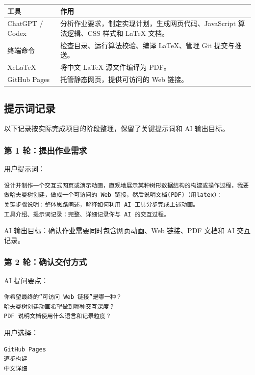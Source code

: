 \documentclass[UTF8,a4paper,12pt]{ctexart}
\begin{document}
\begin{longtable}{|p{3cm}|p{10cm}|}
\hline
工具 & 作用 \\
\hline
ChatGPT / Codex & 分析作业要求，制定实现计划，生成网页代码、JavaScript 算法逻辑、CSS 样式和 LaTeX 文档。 \\
\hline
终端命令 & 检查目录、运行算法校验、编译 LaTeX、管理 Git 提交与推送。 \\
\hline
XeLaTeX & 将中文 LaTeX 源文件编译为 PDF。 \\
\hline
GitHub Pages & 托管静态网页，提供可访问的 Web 链接。 \\
\hline
\end{longtable}

\subsection{提示词记录}

以下记录按实际完成项目的阶段整理，保留了关键提示词和 AI 输出目标。

\subsubsection*{第 1 轮：提出作业需求}

用户提示词：

\begin{lstlisting}
设计并制作一个交互式网页或演示动画，直观地展示某种树形数据结构的构建或操作过程，我要做哈夫曼树创建，做成一个可访问的 Web 链接，然后说明文档(PDF)（用latex）：
关键步骤说明：整体思路阐述，解释如何利用 AI 工具分步完成上述动画。
工具介绍、提示词记录：完整、详细记录你与 AI 的交互过程。
\end{lstlisting}

AI 输出目标：确认作业需要同时包含网页动画、Web 链接、PDF 文档和 AI 交互记录。

\subsubsection*{第 2 轮：确认交付方式}

AI 提问要点：

\begin{lstlisting}
你希望最终的“可访问 Web 链接”是哪一种？
哈夫曼树创建动画希望做到哪种交互深度？
PDF 说明文档使用什么语言和记录粒度？
\end{lstlisting}

用户选择：

\begin{lstlisting}
GitHub Pages
逐步构建
中文详细
\end{lstlisting}
\end{document}
